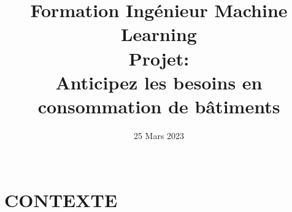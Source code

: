 \documentclass[8pt,xcolor=pdftex,table]{beamer}
\title[]{\vspace{22mm}Formation \alert{Ingénieur Machine Learning}\\\vspace{6mm}Projet:\\Anticipez les besoins en consommation de bâtiments}
\date[]{25 Mars 2023\\\vspace{18mm}\\\tit{thomas.durandtexte@protonmail.com}}
\begin{document}

\begin{frame}
	\titlepage{}
\end{frame}


\section{CONTEXTE}






\end{document}
